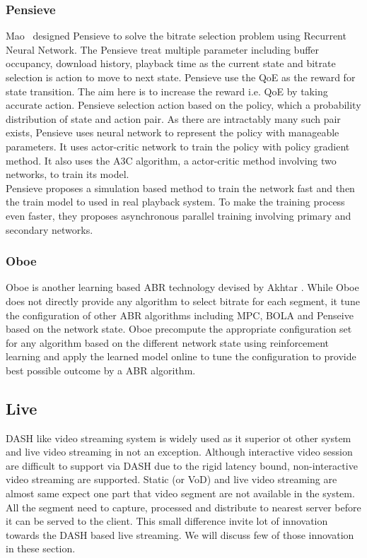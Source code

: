\subsubsection{Pensieve}
Mao \etal\ designed Pensieve\cite{10.1145/3098822.3098843} to solve the bitrate selection problem using Recurrent Neural Network. The Pensieve treat multiple parameter including buffer occupancy, download history, playback time as the current state and bitrate selection is action to move to next state. Pensieve use the QoE as the reward for state transition. The aim here is to increase the reward i.e. QoE by taking accurate action. Pensieve selection action based on the policy, which a probability distribution of state and action pair. As there are intractably many such pair exists, Pensieve uses neural network to represent the policy with manageable parameters. It uses actor-critic network to train the policy with policy gradient method\cite{sutton1999policy}. It also uses the A3C\cite{10.5555/3045390.3045594} algorithm, a actor-critic method involving two networks, to train its model.\\
Pensieve proposes a simulation based method to train the network fast and then the train model to used in real playback system. To make the training process even faster, they proposes asynchronous parallel training involving primary and secondary networks.

\subsubsection{Oboe}
Oboe\cite{10.1145/3230543.3230558} is another learning based ABR technology devised by Akhtar \etal. While Oboe does not directly provide any algorithm to select bitrate for each segment, it tune the configuration of other ABR algorithms including MPC\cite{}, BOLA\cite{} and Penseive\cite{} based on the network state. Oboe precompute the appropriate configuration set for any algorithm based on the different network state using reinforcement learning and apply the learned model online to tune the configuration to provide best possible outcome by a ABR algorithm.

\subsection{Live}
DASH like video streaming system is widely used as it superior ot other system and live video streaming in not an exception. Although interactive video session are difficult to support via DASH due to the rigid latency bound, non-interactive video streaming are supported. Static (or VoD) and live video streaming are almost same expect one part that video segment are not available in the system. All the segment need to capture, processed and distribute to nearest server before it can be served to the client. This small difference invite lot of innovation towards the DASH based live streaming. We will discuss few of those innovation in these section.



